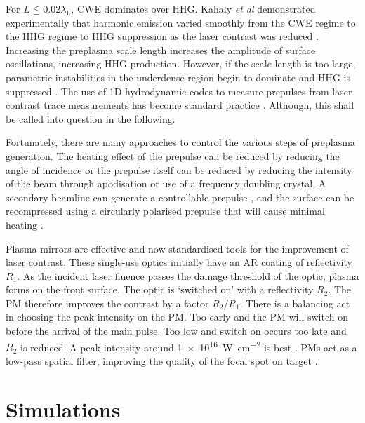 For $L \leqq 0.02 \lambda_\mathrm{L}$, \ac{CWE} dominates over HHG. Kahaly \textit{et al} demonstrated experimentally that harmonic emission varied smoothly from the CWE regime to the HHG regime to HHG suppression as the laser contrast was reduced  \cite{kahalyDirectObservationDensityGradient2013}. Increasing the preplasma scale length increases the amplitude of surface oscillations, increasing HHG production. However, if the scale length is too large, parametric instabilities in the underdense region begin to dominate and HHG is suppressed \cite{dollarScalingHighorderHarmonic2013}. The use of 1D hydrodynamic codes to measure prepulses from laser contrast trace measurements has become standard practice \cite{behmkeControllingSpacingAttosecond2011, dollarScalingHighorderHarmonic2013, liExperimentalDemonstrationEfficient2022}. Although, this shall be called into question in the following.

Fortunately, there are many approaches to control the various steps of preplasma generation. The heating effect of the prepulse can be reduced by reducing the angle of incidence or the prepulse itself can be reduced by reducing the intensity of the beam through apodisation or use of a frequency doubling crystal. A secondary beamline can generate a controllable prepulse \cite{kahalyDirectObservationDensityGradient2013}, and the surface can be recompressed using a circularly polarised prepulse that will cause minimal heating \cite{liExperimentalDemonstrationEfficient2022}.

Plasma mirrors are effective and now standardised tools for the improvement of laser contrast. These single-use optics initially have an \ac{AR} coating of reflectivity $R_1$. As the incident laser fluence passes the damage threshold of the optic, plasma forms on the front surface. The optic is `switched on' with a reflectivity $R_2$. The \ac{PM} therefore improves the contrast by a factor $R_2/R_1$. There is a balancing act in choosing the peak intensity on the \ac{PM}. Too early and the PM will switch on before the arrival of the main pulse. Too low and switch on occurs too late and $R_2$ is reduced. A peak intensity around \qty{1e16}{W.cm^{-2}} is best \cite{caiTimeresolvedMeasurementsReflectivity2009}. PMs act as a low-pass spatial filter, improving the quality of the focal spot on target \cite{doumyCompleteCharacterizationPlasma2004}. 

\section{\label{ch:3-sec:simulations}Simulations}
